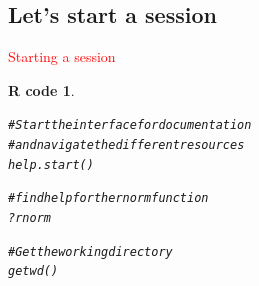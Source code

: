 \documentclass[11pt]{beamer}\usepackage[]{graphicx}\usepackage[]{color}
\makeatletter
\newcommand{\hlcom}[1]{\textcolor[rgb]{0.588,0.588,0.588}{#1}}%
\newcommand{\hlopt}[1]{\textcolor[rgb]{0.196,0.196,0.196}{#1}}%
\newcommand{\hlstd}[1]{\textcolor[rgb]{0.196,0.196,0.196}{#1}}%
\newcommand{\hlkwd}[1]{\textcolor[rgb]{0.78,0.227,0.412}{#1}}%
\newenvironment{kframe}{%
 \def\at@end@of@kframe{}%
 \ifinner\ifhmode%
  \def\at@end@of@kframe{\end{minipage}}%
  \begin{minipage}{\columnwidth}%
 \fi\fi%
 \def\FrameCommand##1{\hskip\@totalleftmargin \hskip-\fboxsep
 \colorbox{shadecolor}{##1}\hskip-\fboxsep
     \hskip-\linewidth \hskip-\@totalleftmargin \hskip\columnwidth}%
 \MakeFramed {\advance\hsize-\width
   \@totalleftmargin\z@ \linewidth\hsize
   \@setminipage}}%
 {\par\unskip\endMakeFramed%
 \at@end@of@kframe}
\newenvironment{knitrout}{}{} %
\newtheorem{rcode}{R code}[section]
\makeatother
\begin{document}








\subsection{Let's start a session}

\begin{frame}
 \begin{center}
  \Huge{\textcolor{red}{Starting a session}}
 \end{center}
\end{frame}


\begingroup
\makeatletter
\setlength{\hoffset}{-.5\beamer@sidebarwidth}
\makeatother
\begin{frame}
\begin{knitrout}
\color{fgcolor}\begin{kframe}
\begin{rcode}\label{label}\begin{alltt}
\hlcom{# Start the interface for documentation}
\hlcom{# and navigate the different resources}
\hlkwd{help.start}\hlstd{()}

\hlcom{# find help for the rnorm function}
\hlopt{?}\hlstd{rnorm}

\hlcom{# Get the working directory}
\hlkwd{getwd}\hlstd{()}
\end{alltt}
\end{rcode}\end{kframe}
\end{knitrout}
\end{frame}

\end{document}
